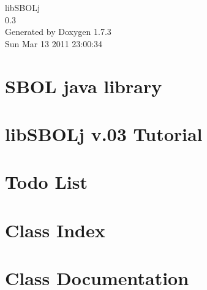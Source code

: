 \documentclass[a4paper]{book}
\begin{document}
\hypersetup{pageanchor=false}
\begin{titlepage}
\vspace*{7cm}
\begin{center}
{\Large libSBOLj \\[1ex]\large 0.3 }\\
\vspace*{1cm}
{\large Generated by Doxygen 1.7.3}\\
\vspace*{0.5cm}
{\small Sun Mar 13 2011 23:00:34}\\
\end{center}
\end{titlepage}
\clearemptydoublepage
{}
\tableofcontents
\clearemptydoublepage
{}
\hypersetup{pageanchor=true}
\chapter{SBOL java library}
\label{index}\hypertarget{index}{}
\chapter{libSBOLj v.03 Tutorial}
\label{tutorial}
\hypertarget{tutorial}{}

\chapter{Todo List}
\label{todo}
\hypertarget{todo}{}

\chapter{Class Index}

\chapter{Class Documentation}














\printindex
\end{document}
